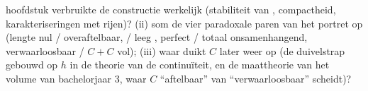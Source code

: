 \begin{problem}[{Weekendopgave --- de \omterm{pb:b1:topology:1}{Cantorverzameling} van de middelste
derden: lengte nul, overaftelbaar, perfect, en $C + C = \intcc{0}{2}$}]
\begin{enumerate}[resume]
        hoofdstuk verbruikte de constructie werkelijk (stabiliteit van
        , compactheid, karakteriseringen met
        rijen)? (ii) som de vier paradoxale paren van het portret op
        (lengte nul / overaftelbaar,  / leeg , perfect
        / totaal onsamenhangend, verwaarloosbaar / $C+C$ vol); (iii)
        waar duikt $C$ later weer op (de duivelstrap gebouwd op $h$ in
        de theorie van de continuïteit, en de maattheorie van het volume
        van bachelorjaar 3, waar $C$ ``aftelbaar'' van
        ``verwaarloosbaar'' scheidt)?
\end{enumerate}
\end{problem}
